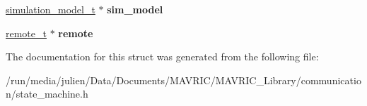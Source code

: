 \begin{DoxyCompactItemize}
\item 
\hypertarget{structstate__machine__t_a6681b084871361e1f1a3e75ddddb4ea0}{\hyperlink{structsimulation__model__t}{simulation\+\_\+model\+\_\+t} $\ast$ {\bfseries sim\+\_\+model}}\label{structstate__machine__t_a6681b084871361e1f1a3e75ddddb4ea0}

\item 
\hypertarget{structstate__machine__t_ab43b1e11745e3d3c162cc309348d9088}{\hyperlink{structremote__t}{remote\+\_\+t} $\ast$ {\bfseries remote}}\label{structstate__machine__t_ab43b1e11745e3d3c162cc309348d9088}

\end{DoxyCompactItemize}


The documentation for this struct was generated from the following file\+:\begin{DoxyCompactItemize}
\item 
/run/media/julien/\+Data/\+Documents/\+M\+A\+V\+R\+I\+C/\+M\+A\+V\+R\+I\+C\+\_\+\+Library/communication/state\+\_\+machine.\+h\end{DoxyCompactItemize}
